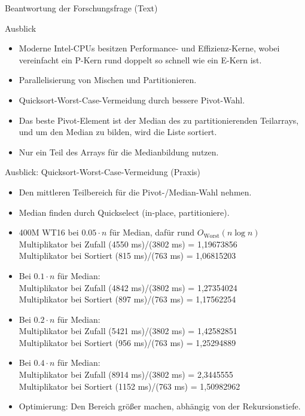 \documentclass[10pt, ngerman]{beamer}
\begin{document}
\begin{frame}{Beantwortung der Forschungsfrage (Text)}
    \BeantwortungDerForschungsfrage
\end{frame}

\begin{frame}{Ausblick}
    \begin{itemize}
        \item Moderne Intel-CPUs besitzen Performance- und Effizienz-Kerne,
              wobei vereinfacht ein P-Kern rund doppelt so schnell wie ein E-Kern ist.
        \item Parallelisierung von Mischen und Partitionieren.
        \item Quicksort-Worst-Case-Vermeidung durch bessere Pivot-Wahl.
        \item Das beste Pivot-Element ist der Median des zu partitionierenden Teilarrays,
              und um den Median zu bilden, wird die Liste sortiert.
        \item Nur ein Teil des Arrays für die Medianbildung nutzen.
    \end{itemize}
\end{frame}

\begin{frame}{Ausblick: Quicksort-Worst-Case-Vermeidung (Praxis)}
    \begin{itemize}
        \item Den mittleren Teilbereich für die Pivot-/Median-Wahl nehmen.
        \item Median finden durch Quickselect (in-place, partitioniere).
        \item 400M WT16 bei $0.05 \cdot n$ für Median, dafür rund $O_{\text{Worst}}(n \log n)$ \\
              Multiplikator bei Zufall (4550 ms)/(3802 ms) = 1,19673856 \\
              Multiplikator bei Sortiert (815 ms)/(763 ms) = 1,06815203
        \item Bei $0.1 \cdot n$ für Median: \\
              Multiplikator bei Zufall (4842 ms)/(3802 ms) = 1,27354024 \\
              Multiplikator bei Sortiert (897 ms)/(763 ms) = 1,17562254
        \item Bei $0.2 \cdot n$ für Median: \\
              Multiplikator bei Zufall (5421 ms)/(3802 ms) = 1,42582851 \\
              Multiplikator bei Sortiert (956 ms)/(763 ms) = 1,25294889
        \item Bei $0.4 \cdot n$ für Median: \\
              Multiplikator bei Zufall (8914 ms)/(3802 ms) = 2,3445555 \\
              Multiplikator bei Sortiert (1152 ms)/(763 ms) = 1,50982962
        \item Optimierung: Den Bereich größer machen, abhängig von der Rekursionstiefe.
    \end{itemize}
\end{frame}
\end{document}
